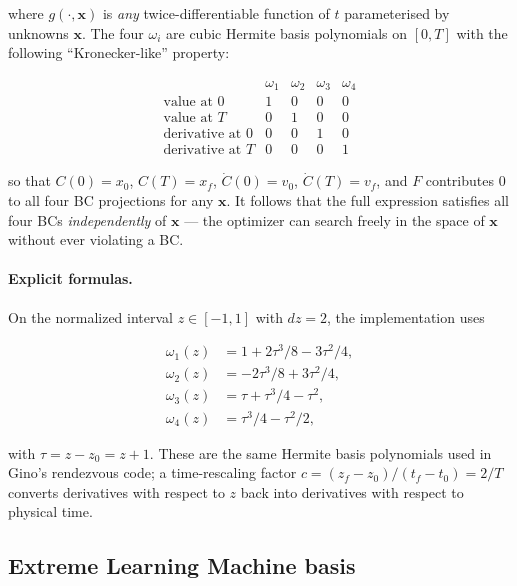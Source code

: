 \documentclass[8pt,a4paper]{article}
\newcommand{\bvec}[1]{\bm{#1}}
\newcommand{\xvec}{\bvec{x}}
\theoremstyle{definition}
\theoremstyle{remark}
\begin{document}
where $g(\cdot, \xvec)$ is \emph{any} twice-differentiable function
of $t$ parameterised by unknowns $\xvec$. The four $\omega_i$ are
cubic Hermite basis polynomials on $[0, T]$ with the following
``Kronecker-like'' property:

\begin{equation}
  \begin{array}{c|cccc}
     & \omega_1 & \omega_2 & \omega_3 & \omega_4 \\
    \hline
     \text{value at } 0           & 1 & 0 & 0 & 0 \\
     \text{value at } T           & 0 & 1 & 0 & 0 \\
     \text{derivative at } 0      & 0 & 0 & 1 & 0 \\
     \text{derivative at } T      & 0 & 0 & 0 & 1
  \end{array}
\end{equation}

so that $C(0) = x_0$, $C(T) = x_f$, $\dot C(0) = v_0$, $\dot C(T) =
v_f$, and $F$ contributes $0$ to all four BC projections for any
$\xvec$. It follows that the full expression satisfies all four BCs
\emph{independently} of $\xvec$ --- the optimizer can search freely
in the space of $\xvec$ without ever violating a BC.

\paragraph{Explicit formulas.}
On the normalized interval $z \in [-1, 1]$ with $dz = 2$, the
implementation uses

\begin{align}
  \omega_1(z) &=  1 + 2\tau^3/8 - 3\tau^2/4, \\
  \omega_2(z) &= -2\tau^3/8 + 3\tau^2/4, \\
  \omega_3(z) &=  \tau + \tau^3/4 - \tau^2, \\
  \omega_4(z) &=  \tau^3/4 - \tau^2/2,
\end{align}

with $\tau = z - z_0 = z + 1$. These are the same Hermite basis
polynomials used in Gino's rendezvous code; a time-rescaling factor
$c = (z_f - z_0)/(t_f - t_0) = 2/T$ converts derivatives with
respect to $z$ back into derivatives with respect to physical time.

\subsection{Extreme Learning Machine basis}
\end{document}
